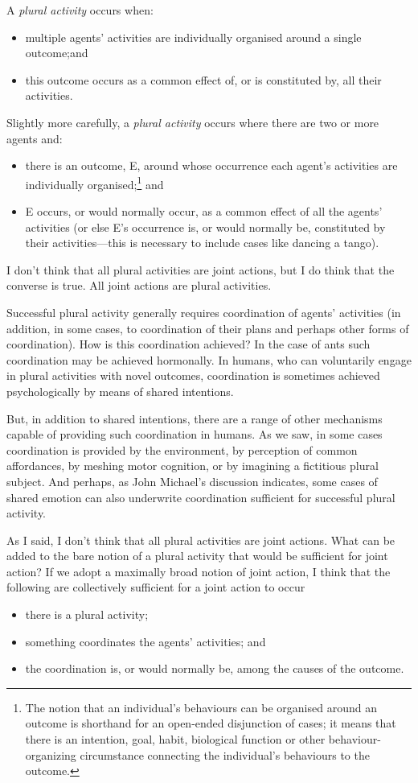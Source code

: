 \documentclass[12pt,a4paper]{extarticle}
\begin{document}
A \emph{plural activity} occurs when:
\begin{itemize}
\item multiple agents’ activities are individually organised around a single outcome;and 
\item this outcome occurs as a common effect of, or is constituted by, all their activities.
\end{itemize}
\footnotesize Slightly more carefully, a \emph{plural activity} occurs where there are two or more agents and:
\begin{itemize}
\item there is an outcome, E, around whose occurrence each agent's activities are individually organised;\footnote{
The notion that an individual’s behaviours can be organised around an outcome is shorthand for an open-ended disjunction of cases; it means that there is an intention, goal, habit, biological function or other behaviour-organizing circumstance connecting the individual’s behaviours to the outcome.
}
and
\item E occurs, or would normally occur, as a common effect of all the agents' activities (or else E's occurrence is, or would normally be, constituted by their activities---this is necessary to include cases like dancing a tango).
\end{itemize}
\normalsize I don't think that all plural activities are joint actions, but I do think that the converse is true.  All joint actions are plural activities.


Successful plural activity generally requires coordination of agents' activities (in addition, in some cases, to coordination of their plans and perhaps other forms of coordination).  
How is this coordination achieved?  
In the case of ants such coordination may be achieved hormonally.  
In humans, who can voluntarily engage in plural activities with novel outcomes, coordination is sometimes achieved psychologically by means of shared intentions.  

But, in addition to shared intentions, there are a range of other mechanisms capable of providing such coordination in humans.  
As we saw, in some cases coordination is provided by the environment, by perception of common affordances, by meshing motor cognition, or by imagining a fictitious plural subject.  
And perhaps, as John Michael's discussion indicates, some cases of shared emotion can also underwrite coordination sufficient for successful plural activity.


As I said, I don't think that all plural activities are joint actions.
What can be added to the bare notion of a plural activity that would be sufficient for joint action?
If we adopt a maximally broad notion of joint action,
I think that the following are
collectively sufficient for a joint action to occur
\begin{itemize}
\item there is a plural activity;
\item something coordinates the agents' activities; and
\item the coordination is, or would normally be, among the causes of the outcome.
\end{itemize}
\end{document}
